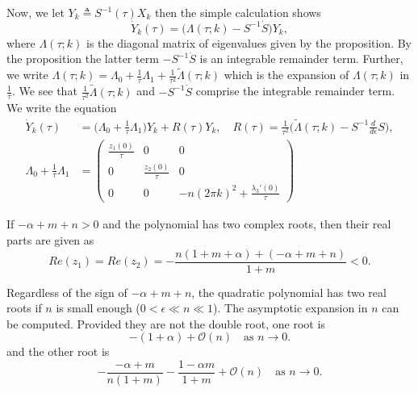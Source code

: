 \documentclass[a4paper,11pt]{article}
\theoremstyle{remark}
\begin{document}
Now, we let $Y_k \triangleq S^{-1}(\tau)X_k$ then the simple calculation shows
$$ \dot{Y}_k(\tau) = \Big(\Lambda(\tau;k) - S^{-1}\dot{S}\Big) Y_k,$$
where $\Lambda(\tau;k)$ is the diagonal matrix of eigenvalues given by the proposition. By the proposition the latter term $- S^{-1}\dot{S}$ is an integrable remainder term. Further, we write $\Lambda(\tau;k) = \Lambda_0 + \frac{1}{\tau}\Lambda_1 + \frac{1}{\tau^2}\tilde{\Lambda}(\tau;k)$ which is the expansion of $\Lambda(\tau;k)$ in $\frac{1}{\tau}$. We see that $\frac{1}{\tau^2}\tilde{\Lambda}(\tau;k)$ and $- S^{-1}\dot{S}$ comprise the integrable remainder term. We write the equation
\begin{align} 
\dot{Y}_k(\tau) &= \Big(\Lambda_0 + \frac{1}{\tau}\Lambda_1\Big) Y_k + R(\tau) Y_k, \quad R(\tau) = \frac{1}{\tau^2}\Big(\tilde{\Lambda}(\tau;k)- S^{-1}\frac{d}{d\epsilon}{S}\Big), \label{eq:diagonalsystem} \\
 \Lambda_0 + \frac{1}{\tau}\Lambda_1 &= 
 \begin{pmatrix} 
  \frac{z_1(0)}{\tau} & 0 & 0\\
  0 & \frac{z_2(0)}{\tau} & 0\\
  0 & 0 & -n(2\pi k)^2 + \frac{\lambda_3'(0)}{\tau}
 \end{pmatrix}
\end{align}





If $-\alpha+m+n>0$ and the polynomial has two complex roots, then their real parts are given as
$$ Re(z_1) = Re(z_2) = -\frac{n(1+m+\alpha) + (-\alpha+m+n)}{1+m} < 0.$$

Regardless of the sign of $-\alpha+m+n$, the quadratic polynomial has two real roots if $n$ is small enough ($0<\epsilon\ll n\ll1$). The asymptotic expansion in $n$ can be computed.  Provided they are not the double root, one root is $$-(1+\alpha) + \mathcal{O}(n) \quad \text{as $n \rightarrow 0$.} $$ and the other root is $$- \frac{-\alpha+m}{n(1+m)} - \frac{1-\alpha m}{1+m} + \mathcal{O}(n) \quad \text{as $n \rightarrow 0$.}$$
\end{document}
